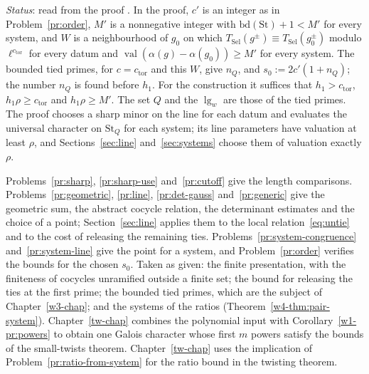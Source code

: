 \documentclass[reqno]{amsart}
\newcounter{chap}
\theoremstyle{definition}
\theoremstyle{plain}
\newcommand{\val}{\operatorname{val}}
\newcommand{\St}{\mathrm{St}}
\newcommand{\bd}{\mathrm{bd}}
\newcommand{\TS}{T_{\mathrm{Sel}}}
\newcommand{\ctor}{c_{\mathrm{tor}}}
\begin{document}
\emph{Status}: read from the proof \cite{GL}.  In the proof, \(c'\) is an integer as in Problem~\ref{pr:order}, \(M'\) is a nonnegative integer with \(\bd(\St) + 1 < M'\) for every system, and \(W\) is a neighbourhood of \(g_0\) on which \(\TS(g^{\pm}) \equiv \TS(g_0^{\pm})\) modulo \(\ell^{\ctor}\) for every datum and \(\val(\alpha(g) - \alpha(g_0)) \ge M'\) for every system.  The bounded tied primes, for \(c = \ctor\) and this \(W\), give \(n_Q\), and \(s_0 := 2c'(1 + n_Q)\); the number \(n_Q\) is found before \(h_1\).  For the construction it suffices that \(h_1 > \ctor\), \(h_1\rho \ge \ctor\) and \(h_1\rho \ge M'\).  The set \(Q\) and the \(\lg_w\) are those of the tied primes.  The proof chooses a sharp minor on the line for each datum and evaluates the universal character on \(\St_Q\) for each system; its line parameters have valuation at least \(\rho\), and Sections~\ref{sec:line} and~\ref{sec:systems} choose them of valuation exactly \(\rho\).

Problems~\ref{pr:sharp}, \ref{pr:sharp-use} and~\ref{pr:cutoff} give the length comparisons.  Problems~\ref{pr:geometric}, \ref{pr:line}, \ref{pr:det-gauss} and~\ref{pr:generic} give the geometric sum, the abstract cocycle relation, the determinant estimates and the choice of a point; Section~\ref{sec:line} applies them to the local relation~\eqref{eq:untie} and to the cost of releasing the remaining ties.  Problems~\ref{pr:system-congruence} and~\ref{pr:system-line} give the point for a system, and Problem~\ref{pr:order} verifies the bounds for the chosen \(s_0\).  Taken as given: the finite presentation, with the finiteness of cocycles unramified outside a finite set; the bound for releasing the ties at the first prime; the bounded tied primes, which are the subject of Chapter~\ref{w3-chap}; and the systems of the ratios (Theorem~\ref{w4-thm:pair-system}).  Chapter~\ref{tw-chap} combines the polynomial input with Corollary~\ref{w1-pr:powers} to obtain one Galois character whose first \(m\) powers satisfy the bounds of the small-twists theorem.  Chapter~\ref{tw-chap} uses the implication of Problem~\ref{pr:ratio-from-system} for the ratio bound in the twisting theorem.
\end{document}
